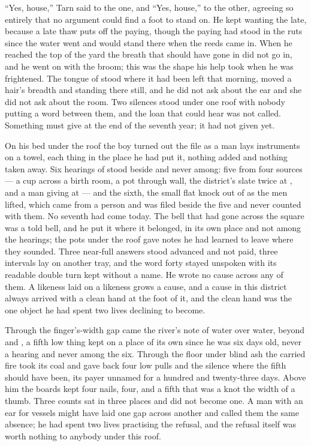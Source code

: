 “Yes, house,” Tarn said to the one, and “Yes, house,” to the other, agreeing so entirely that no argument could find a foot to stand on. He kept wanting the late, because a late thaw puts off the paying, though the paying had stood in the ruts since the water went and would stand there when the reeds came in. When he reached the top of the yard the breath that should have gone in did not go in, and he went on with the broom; this was the shape his help took when he was frightened. The tongue of  stood where it had been left that morning, moved a hair's breadth and standing there still, and he did not ask about the ear and she did not ask about the room. Two silences stood under one roof with nobody putting a word between them, and the loan that could hear was not called. Something must give at the end of the seventh year; it had not given yet.

\scenebreak

On his bed under the roof the boy turned out the file as a man lays instruments on a towel, each thing in the place he had put it, nothing added and nothing taken away. Six hearings of  stood beside and never among: five from four sources --- a cup across a birth room, a pot through  wall, the district's slate twice at , and a man giving at  --- and the sixth, the small flat knock out of  as the men lifted, which came from a person and was filed beside the five and never counted with them. No seventh had come today. The bell that had gone across the square was a told bell, and he put it where it belonged, in its own place and not among the hearings; the pots under the roof gave notes he had learned to leave where they sounded. Three near-full answers stood advanced and not paid, three intervals lay on another tray, and the word forty stayed unspoken with its readable double turn kept without a name. He wrote no cause across any of them. A likeness laid on a likeness grows a cause, and a cause in this district always arrived with a clean hand at the foot of it, and the clean hand was the one object he had spent two lives declining to become.

Through the finger's-width gap came the river's note of water over water, beyond  and , a fifth low thing kept on a place of its own since he was six days old, never a hearing and never among the six. Through the floor under blind ash the carried fire took its coal and gave back four low pulls and the silence where the fifth should have been, its payer unnamed for a hundred and twenty-three days. Above him the boards kept four nails, four, and a fifth that was a knot the width of a thumb. Three counts sat in three places and did not become one. A man with an ear for vessels might have laid one gap across another and called them the same absence; he had spent two lives practising the refusal, and the refusal itself was worth nothing to anybody under this roof.

